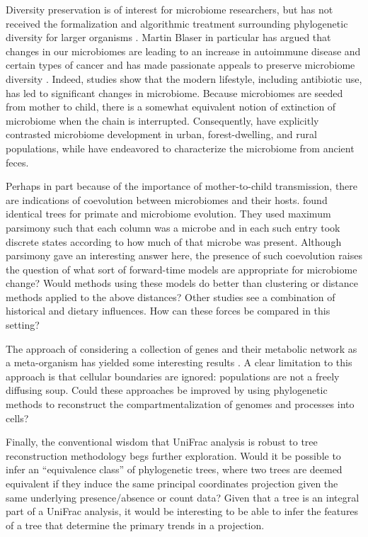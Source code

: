 \documentclass{amsart}
\begin{document}
Diversity preservation is of interest for microbiome researchers, but has not received the formalization and algorithmic treatment surrounding phylogenetic diversity for larger organisms \citep{hartmann2006maximizing,pardi2007resource}.
Martin Blaser in particular has argued that changes in our microbiomes are leading to an increase in autoimmune disease and certain types of cancer \citep[reviewed in][]{cho2012human} and has made passionate appeals to preserve microbiome diversity \citep{blaser2011antibiotic}.
Indeed, studies show that the modern lifestyle, including antibiotic use, has led to significant changes in microbiome.
Because microbiomes are seeded from mother to child, there is a somewhat equivalent notion of extinction of microbiome when the chain is interrupted.
Consequently, \citet{yatsunenko2012human} have explicitly contrasted microbiome development in urban, forest-dwelling, and rural populations, while \citet{tito2012insights} have endeavored to characterize the microbiome from ancient feces.

Perhaps in part because of the importance of mother-to-child transmission, there are indications of coevolution between microbiomes and their hosts.
\citet{ochman2010evolutionary} found identical trees for primate and microbiome evolution.
They used maximum parsimony such that each column was a microbe and in each such entry took discrete states according to how much of that microbe was present.
Although parsimony gave an interesting answer here, the presence of such coevolution raises the question of what sort of forward-time models are appropriate for microbiome change?
Would methods using these models do better than clustering or distance methods applied to the above distances?
Other studies \citep[e.g.][]{phillips2012microbiome,delsuc2013convergence} see a combination of historical and dietary influences.
How can these forces be compared in this setting?

The approach of considering a collection of genes and their metabolic network as a meta-organism has yielded some interesting results \citep{borenstein2008large,greenblum2012metagenomic}.
A clear limitation to this approach is that cellular boundaries are ignored: populations are not a freely diffusing soup.
Could these approaches be improved by using phylogenetic methods to reconstruct the compartmentalization of genomes and processes into cells?

Finally, the conventional wisdom that UniFrac analysis is robust to tree reconstruction methodology begs further exploration.
Would it be possible to infer an ``equivalence class'' of phylogenetic trees, where two trees are deemed equivalent if they induce the same principal coordinates projection given the same underlying presence/absence or count data?
Given that a tree is an integral part of a UniFrac analysis, it would be interesting to be able to infer the features of a tree that determine the primary trends in a projection.
\end{document}
